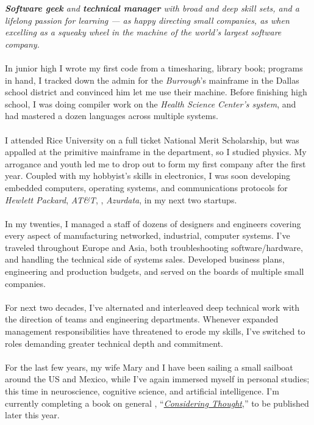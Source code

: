 \documentclass[10pt,a4paper]{article}
\begin{document}
\vspace{-1.3em}  %
\begin{multicols}{2}  %
\noindent \emph{\textbf{Software geek} and \textbf{technical manager} with broad and deep skill sets, and a lifelong passion for learning --- as happy directing small companies, as when excelling as a squeaky wheel in the machine of the world's largest software company.}
\\
\\
In junior high I wrote my first code from a \textit{} timesharing, library book; programs in hand, I tracked down the admin for the \textit{Burrough}'s mainframe in the Dallas school district and convinced him let me use their machine. Before finishing high school, I was doing compiler work on the \textit{ Health Science Center's system}, and had mastered a dozen languages across multiple systems.
\\
\\
I attended Rice University on a full ticket National Merit Scholarship, but was appalled at the primitive  mainframe in the  department, so I studied physics. My arrogance and youth led me to drop out to form my first company after the first year. Coupled with my hobbyist's skills in electronics, I was soon developing embedded computers, operating systems, and communications protocols for \textit{Hewlett Packard}, \textit{AT\&T}, \textit{}, \textit{Azurdata}, in my next two startups.
\\
\\
In my twenties, I managed a staff of dozens of designers and engineers covering every aspect of manufacturing networked, industrial, computer systems. I've traveled throughout Europe and Asia, both troubleshooting software/hardware, and handling the technical side of systems sales. Developed business plans, engineering and production budgets, and served on the boards of multiple small companies.
\\
\\
For next two decades, I've alternated and interleaved deep technical work with the direction of teams and engineering departments. Whenever expanded management responsibilities have threatened to erode my skills, I've switched to roles demanding greater technical depth and commitment.
\\
\\
For the last few years, my wife Mary and I have been sailing a small sailboat around the US and Mexico, while I've again immersed myself in personal studies; this time in neuroscience, cognitive science, and artificial intelligence. I'm currently completing  a book on general , ``\href{http://consideringthought.com/}{\textit{Considering Thought}},'' to be published later this year.

\end{multicols}
\end{document}
